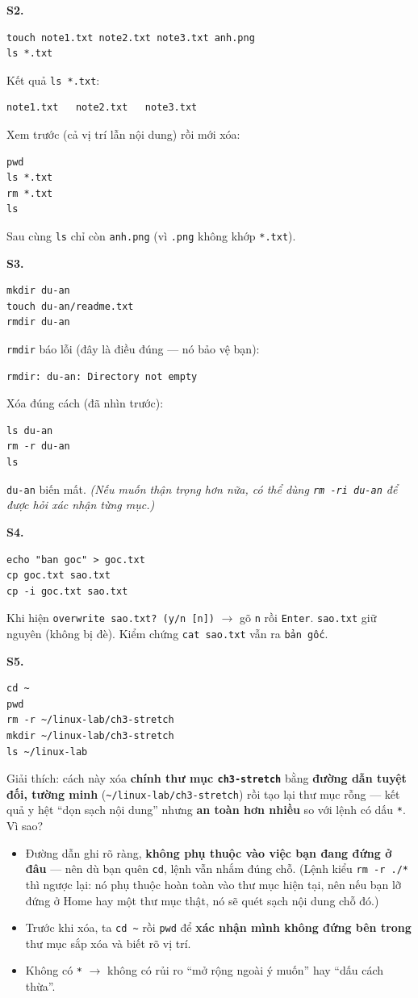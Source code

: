 \documentclass[12pt,a4paper]{article}
\newcommand{\cmd}[1]{\texttt{#1}}
\begin{document}
\textbf{S2.}
\begin{Verbatim}
touch note1.txt note2.txt note3.txt anh.png
ls *.txt
\end{Verbatim}
Kết quả \cmd{ls *.txt}:
\begin{Verbatim}
note1.txt   note2.txt   note3.txt
\end{Verbatim}
Xem trước (cả vị trí lẫn nội dung) rồi mới xóa:
\begin{Verbatim}
pwd
ls *.txt
rm *.txt
ls
\end{Verbatim}
Sau cùng \cmd{ls} chỉ còn \cmd{anh.png} (vì \cmd{.png} không khớp \cmd{*.txt}).

\textbf{S3.}
\begin{Verbatim}
mkdir du-an
touch du-an/readme.txt
rmdir du-an
\end{Verbatim}
\cmd{rmdir} báo lỗi (đây là điều đúng --- nó bảo vệ bạn):
\begin{Verbatim}
rmdir: du-an: Directory not empty
\end{Verbatim}
Xóa đúng cách (đã nhìn trước):
\begin{Verbatim}
ls du-an
rm -r du-an
ls
\end{Verbatim}
\cmd{du-an} biến mất. \textit{(Nếu muốn thận trọng hơn nữa, có thể dùng \cmd{rm -ri du-an} để được hỏi xác nhận từng mục.)}

\textbf{S4.}
\begin{Verbatim}
echo "ban goc" > goc.txt
cp goc.txt sao.txt
cp -i goc.txt sao.txt
\end{Verbatim}
Khi hiện \cmd{overwrite sao.txt? (y/n [n])} $\rightarrow$ gõ \cmd{n} rồi \cmd{Enter}. \cmd{sao.txt} giữ nguyên (không bị đè). Kiểm chứng \cmd{cat sao.txt} vẫn ra \cmd{bản gốc}.

\textbf{S5.}
\begin{Verbatim}
cd ~
pwd
rm -r ~/linux-lab/ch3-stretch
mkdir ~/linux-lab/ch3-stretch
ls ~/linux-lab
\end{Verbatim}
Giải thích: cách này xóa \textbf{chính thư mục \cmd{ch3-stretch}} bằng \textbf{đường dẫn tuyệt đối, tường minh} (\cmd{\textasciitilde/linux-lab/ch3-stretch}) rồi tạo lại thư mục rỗng --- kết quả y hệt ``dọn sạch nội dung'' nhưng \textbf{an toàn hơn nhiều} so với lệnh có dấu \cmd{*}. Vì sao?

\begin{itemize}[leftmargin=1.4em]
\item Đường dẫn ghi rõ ràng, \textbf{không phụ thuộc vào việc bạn đang đứng ở đâu} --- nên dù bạn quên \cmd{cd}, lệnh vẫn nhắm đúng chỗ. (Lệnh kiểu \cmd{rm -r ./*} thì ngược lại: nó phụ thuộc hoàn toàn vào thư mục hiện tại, nên nếu bạn lỡ đứng ở Home hay một thư mục thật, nó sẽ quét sạch nội dung chỗ đó.)
\item Trước khi xóa, ta \cmd{cd \textasciitilde{}} rồi \cmd{pwd} để \textbf{xác nhận mình không đứng bên trong} thư mục sắp xóa và biết rõ vị trí.
\item Không có \cmd{*} $\rightarrow$ không có rủi ro ``mở rộng ngoài ý muốn'' hay ``dấu cách thừa''.
\end{itemize}
\end{document}
